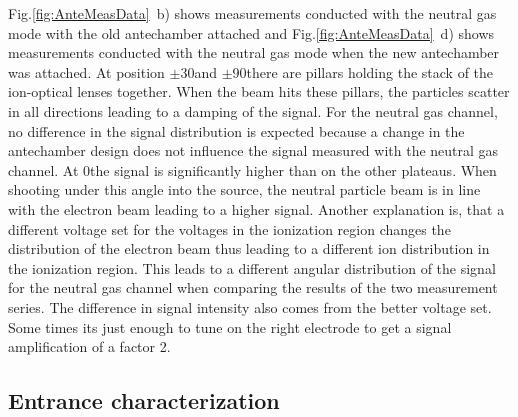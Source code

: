 	Fig.\ref{fig:AnteMeasData}~b) shows measurements conducted with the neutral gas mode with the old antechamber attached and Fig.\ref{fig:AnteMeasData}~d) shows measurements conducted with the neutral gas mode when the new antechamber was attached. At position $\pm$30\degree and $\pm$90\degree there are pillars holding the stack of the ion-optical lenses together. When the beam hits these pillars, the particles scatter in all directions leading to a damping of the signal. For the neutral gas channel, no difference in the signal distribution is expected because a change in the antechamber design does not influence the signal measured with the neutral gas channel. At 0\degree the signal is significantly higher than on the other plateaus. When shooting under this angle into the source, the neutral particle beam is in line with the electron beam leading to a higher signal. Another explanation is, that a different voltage set for the voltages in the ionization region changes the distribution of the electron beam thus leading to a different ion distribution in the ionization region. This leads to a different angular distribution of the signal for the neutral gas channel when comparing the results of the two measurement series. The difference in signal intensity also comes from the better voltage set. Some times its just enough to tune on the right electrode to get a signal amplification of a factor 2.
	
	
	\subsection{Entrance characterization}
	
